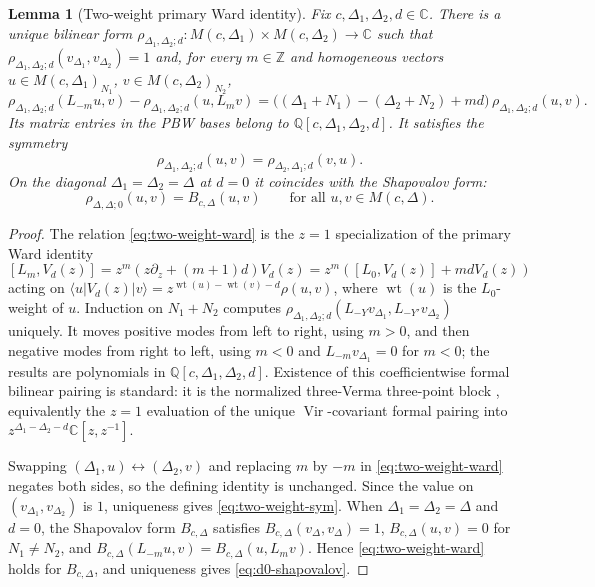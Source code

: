 \documentclass[twoside,10pt]{article}
\numberwithin{equation}{section}
\theoremstyle{slbody}
\newtheorem{lemma}[theorem]{Lemma}
\theoremstyle{definition}
\theoremstyle{remark}
\newcommand{\Vir}{\operatorname{Vir}}
\newcommand{\wt}{\operatorname{wt}}
\begin{document}
\begin{lemma}[Two-weight primary Ward identity]\label{lem:two-weight-ward}
Fix \(c,\Delta_1,\Delta_2,d\in\mathbb{C}\).  There is a unique bilinear form
\(\rho_{\Delta_1,\Delta_2;d}:M(c,\Delta_1)\times M(c,\Delta_2)\to\mathbb{C}\)
such that \(\rho_{\Delta_1,\Delta_2;d}(v_{\Delta_1},v_{\Delta_2})=1\) and,
for every \(m\in\mathbb{Z}\) and homogeneous vectors
\(u\in M(c,\Delta_1)_{N_1}\), \(v\in M(c,\Delta_2)_{N_2}\),
\begin{equation}\label{eq:two-weight-ward}
 \rho_{\Delta_1,\Delta_2;d}(L_{-m}u,v)
 -\rho_{\Delta_1,\Delta_2;d}(u,L_mv)
 =\bigl((\Delta_1+N_1)-(\Delta_2+N_2)+md\bigr)\,
  \rho_{\Delta_1,\Delta_2;d}(u,v).
\end{equation}
Its matrix entries in the PBW bases belong to
\(\mathbb{Q}[c,\Delta_1,\Delta_2,d]\).  It satisfies the symmetry
\begin{equation}\label{eq:two-weight-sym}
 \rho_{\Delta_1,\Delta_2;d}(u,v)=\rho_{\Delta_2,\Delta_1;d}(v,u).
\end{equation}
On the diagonal \(\Delta_1=\Delta_2=\Delta\) at \(d=0\) it coincides with the
Shapovalov form:
\begin{equation}\label{eq:d0-shapovalov}
 \rho_{\Delta,\Delta;0}(u,v)=B_{c,\Delta}(u,v)
 \qquad\text{for all }u,v\in M(c,\Delta).
\end{equation}
\end{lemma}

\begin{proof}
The relation \eqref{eq:two-weight-ward} is the \(z=1\) specialization of the
primary Ward identity
\[
 [L_m,V_d(z)]=z^m(z\partial_z+(m+1)d)V_d(z)=z^m([L_0,V_d(z)]+mdV_d(z))
\]
acting on \(\langle u|V_d(z)|v\rangle=z^{\wt(u)-\wt(v)-d}\rho(u,v)\), where \(\wt(u)\)
is the \(L_0\)-weight of \(u\).  Induction
on \(N_1+N_2\) computes \(\rho_{\Delta_1,\Delta_2;d}(L_{-Y}v_{\Delta_1},
L_{-Y'}v_{\Delta_2})\) uniquely.  It moves positive modes from left to right,
using \(m>0\), and then negative modes from right to left, using \(m<0\) and
\(L_{-m}v_{\Delta_1}=0\) for \(m<0\); the results are polynomials in
\(\mathbb{Q}[c,\Delta_1,\Delta_2,d]\).  Existence of this coefficientwise
formal bilinear pairing is standard: it is the normalized three-Verma
three-point block \cite[\S3, p.~4]{HadaszJaskolskiSuchanek2010},
equivalently the \(z=1\) evaluation of the unique \(\Vir\)-covariant formal
pairing into \(z^{\Delta_1-\Delta_2-d}\mathbb{C}[z,z^{-1}]\).

Swapping \((\Delta_1,u)\leftrightarrow(\Delta_2,v)\) and replacing \(m\) by
\(-m\) in \eqref{eq:two-weight-ward} negates both sides, so the defining
identity is unchanged.  Since the value on \((v_{\Delta_1},v_{\Delta_2})\) is
\(1\), uniqueness gives \eqref{eq:two-weight-sym}.  When
\(\Delta_1=\Delta_2=\Delta\) and \(d=0\), the Shapovalov form \(B_{c,\Delta}\)
satisfies \(B_{c,\Delta}(v_\Delta,v_\Delta)=1\), \(B_{c,\Delta}(u,v)=0\) for
\(N_1\neq N_2\), and \(B_{c,\Delta}(L_{-m}u,v)=B_{c,\Delta}(u,L_mv)\).  Hence
\eqref{eq:two-weight-ward} holds for \(B_{c,\Delta}\), and uniqueness gives
\eqref{eq:d0-shapovalov}.
\end{proof}
\end{document}
